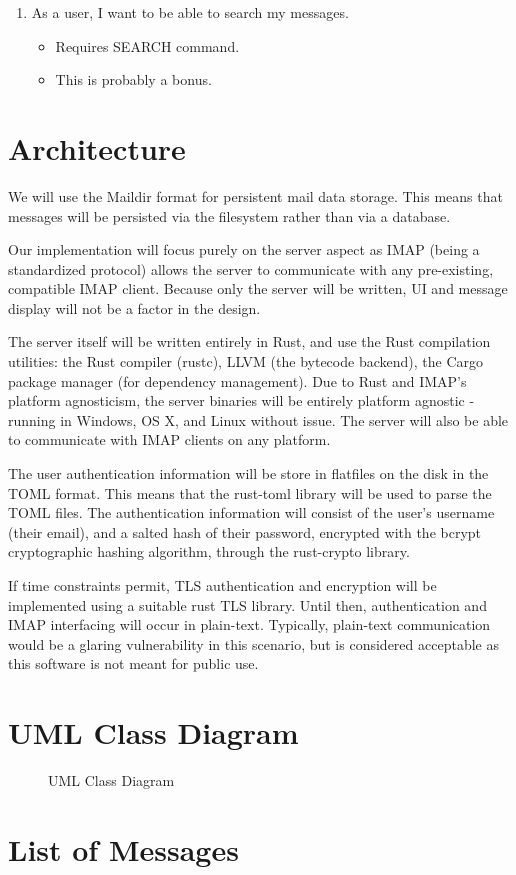 \documentclass[a4paper,12pt]{article}
\begin{document}
\begin{enumerate}
\item As a user, I want to be able to search my messages.

  \begin{itemize}
  \item Requires SEARCH command.
  \item This is probably a bonus.
  \end{itemize}

\end{enumerate}

\section*{Architecture}

We will use the Maildir format for persistent mail data storage. This means that messages will be persisted via the filesystem rather than via a database.

Our implementation will focus purely on the server aspect as IMAP (being a standardized protocol) allows the server to communicate with any pre-existing, compatible IMAP client. Because only the server will be written, UI and message display will not be a factor in the design.

The server itself will be written entirely in Rust, and use the Rust compilation utilities: the Rust compiler (rustc), LLVM (the bytecode backend), the Cargo package manager (for dependency management). Due to Rust and IMAP's platform agnosticism, the server binaries will be entirely platform agnostic - running in Windows, OS X, and Linux without issue. The server will also be able to communicate with IMAP clients on any platform.

The user authentication information will be store in flatfiles on the disk in the TOML format. This means that the rust-toml library will be used to parse the TOML files. The authentication information will consist of the user's username (their email), and a salted hash of their password, encrypted with the bcrypt cryptographic hashing algorithm, through the rust-crypto library.

If time constraints permit, TLS authentication and encryption will be implemented using a suitable rust TLS library. Until then, authentication and IMAP interfacing will occur in plain-text. Typically, plain-text communication would be a glaring vulnerability in this scenario, but is considered acceptable as this software is not meant for public use.

\section*{UML Class Diagram}

\begin{figure}[H]
    \centering
    
    \caption{UML Class Diagram}
\end{figure}

\section*{List of Messages}
\end{document}
